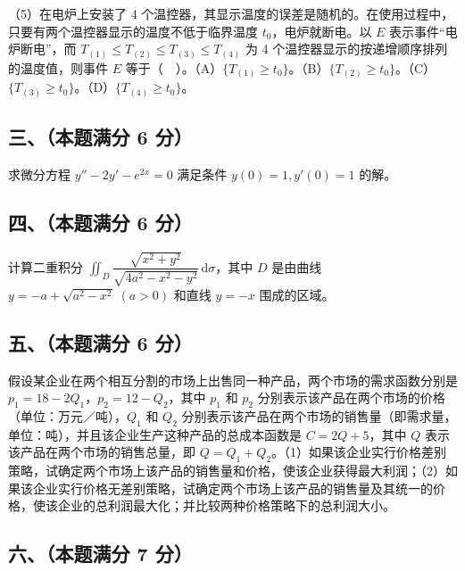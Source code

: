 \documentclass[UTF8,12pt]{ctexart}
\begin{document}
（5）在电炉上安装了 4 个温控器，其显示温度的误差是随机的。在使用过程中，只要有两个温控器显示的温度不低于临界温度 \(\displaystyle t_0\)，电炉就断电。以 \(\displaystyle E\) 表示事件“电炉断电”，而 \(\displaystyle T_{(1)}\le T_{(2)}\le T_{(3)}\le T_{(4)}\) 为 4 个温控器显示的按递增顺序排列的温度值，则事件 \(\displaystyle E\) 等于（　）。（A）\(\displaystyle \{T_{(1)}\ge t_0\}\)。（B）\(\displaystyle \{T_{(2)}\ge t_0\}\)。（C）\(\displaystyle \{T_{(3)}\ge t_0\}\)。（D）\(\displaystyle \{T_{(4)}\ge t_0\}\)。


\subsection*{三、（本题满分 6 分）}

求微分方程 \(\displaystyle y''-2y'-e^{2x}=0\) 满足条件 \(\displaystyle y(0)=1,\allowbreak y'(0)=1\) 的解。


\subsection*{四、（本题满分 6 分）}

计算二重积分 \(\displaystyle \iint_D\dfrac{\displaystyle \sqrt{x^2+y^2}}{\displaystyle \sqrt{4a^2-x^2-y^2}}\,\mathrm d\sigma\)，其中 \(\displaystyle D\) 是由曲线 \(\displaystyle y=-a+\sqrt{a^2-x^2}\;(a>0)\) 和直线 \(\displaystyle y=-x\) 围成的区域。


\subsection*{五、（本题满分 6 分）}

假设某企业在两个相互分割的市场上出售同一种产品，两个市场的需求函数分别是 \(\displaystyle p_1=18-2Q_1\)，\(\displaystyle p_2=12-Q_2\)，其中 \(\displaystyle p_1\) 和 \(\displaystyle p_2\) 分别表示该产品在两个市场的价格（单位：万元／吨），\(\displaystyle Q_1\) 和 \(\displaystyle Q_2\) 分别表示该产品在两个市场的销售量（即需求量，单位：吨），并且该企业生产这种产品的总成本函数是 \(\displaystyle C=2Q+5\)，其中 \(\displaystyle Q\) 表示该产品在两个市场的销售总量，即 \(\displaystyle Q=Q_1+Q_2\)。（1）如果该企业实行价格差别策略，试确定两个市场上该产品的销售量和价格，使该企业获得最大利润；（2）如果该企业实行价格无差别策略，试确定两个市场上该产品的销售量及其统一的价格，使该企业的总利润最大化；并比较两种价格策略下的总利润大小。


\subsection*{六、（本题满分 7 分）}
\end{document}
